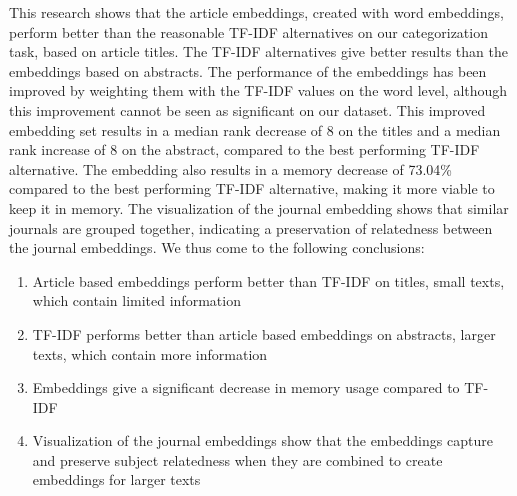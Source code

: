 \documentclass[../../Thesis.tex]{subfiles}
\begin{document}
This research shows that the article embeddings, created with word embeddings, perform better than the reasonable TF-IDF alternatives on our categorization task, based on article titles. The TF-IDF alternatives give better results than the embeddings based on abstracts. The performance of the embeddings has been improved by weighting them with the TF-IDF values on the word level, although this improvement cannot be seen as significant on our dataset. This improved embedding set results in a median rank decrease of 8 on the titles and a median rank increase of 8 on the abstract, compared to the best performing TF-IDF alternative.  The embedding also results in a memory decrease of 73.04\% compared to the best performing TF-IDF alternative, making it more viable to keep it in memory. The visualization of the journal embedding shows that similar journals are grouped together, indicating a preservation of relatedness between the journal embeddings. We thus come to the following conclusions:
\begin{enumerate}
\item{Article based embeddings perform better than TF-IDF on titles, small texts, which contain limited information}
\item{TF-IDF performs better than article based embeddings on abstracts, larger texts, which contain more information}
\item{Embeddings give a significant decrease in memory usage compared to TF-IDF}
\item{Visualization of the journal embeddings show that the embeddings capture and preserve subject relatedness when they are combined to create embeddings for larger texts}

\end{enumerate}
\end{document}
